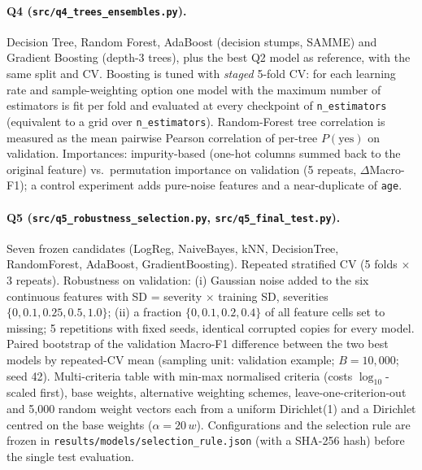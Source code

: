 \paragraph{Q4 (\texttt{src/q4\_trees\_ensembles.py}).} Decision Tree, Random Forest, AdaBoost (decision stumps,
SAMME) and Gradient Boosting (depth-3 trees), plus the best Q2 model as reference, with the same split and CV.
Boosting is tuned with \emph{staged} 5-fold CV: for each learning rate and sample-weighting option one model with
the maximum number of estimators is fit per fold and evaluated at every checkpoint of
\texttt{n\_estimators} (equivalent to a grid over \texttt{n\_estimators}). Random-Forest tree correlation is
measured as the mean pairwise Pearson correlation of per-tree $P(\text{yes})$ on validation. Importances:
impurity-based (one-hot columns summed back to the original feature) vs.\ permutation importance on validation
(5 repeats, $\Delta$Macro-F1); a control experiment adds pure-noise features and a near-duplicate of
\texttt{age}.

\paragraph{Q5 (\texttt{src/q5\_robustness\_selection.py}, \texttt{src/q5\_final\_test.py}).} Seven frozen candidates
(LogReg, NaiveBayes, kNN, DecisionTree, RandomForest, AdaBoost, GradientBoosting). Repeated stratified CV
(5 folds $\times$ 3 repeats). Robustness on validation: (i) Gaussian noise added to the six continuous features
with SD = severity $\times$ training SD, severities $\{0, 0.1, 0.25, 0.5, 1.0\}$; (ii) a fraction
$\{0, 0.1, 0.2, 0.4\}$ of all feature cells set to missing; 5 repetitions with fixed seeds, identical corrupted
copies for every model. Paired bootstrap of the validation Macro-F1 difference between the two best models by
repeated-CV mean (sampling unit: validation example; $B=10{,}000$; seed 42). Multi-criteria table with min-max
normalised criteria (costs $\log_{10}$-scaled first), base weights, alternative weighting schemes,
leave-one-criterion-out and 5{,}000 random weight vectors each from a uniform Dirichlet(1) and a Dirichlet
centred on the base weights ($\alpha = 20\,w$). Configurations and the selection rule are frozen in
\texttt{results/models/selection\_rule.json} (with a SHA-256 hash) before the single test evaluation.
